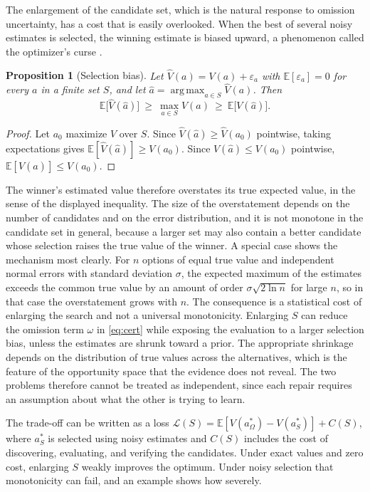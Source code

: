 \documentclass[11pt]{article}
\newtheorem{proposition}{Proposition}
\theoremstyle{definition}
\theoremstyle{remark}
\newcommand{\E}{\mathbb{E}}
\DeclareMathOperator*{\argmax}{arg\,max}
\begin{document}
The enlargement of the candidate set, which is the natural response to omission uncertainty, has a cost that is easily overlooked. When the best of several noisy estimates is selected, the winning estimate is biased upward, a phenomenon called the optimizer's curse \citep{smith2006}.

\begin{proposition}[Selection bias]
\label{prop:curse}
Let $\widehat V(a)=V(a)+\varepsilon_a$ with $\E[\varepsilon_a]=0$ for every $a$ in a finite set $S$, and let $\hat a=\argmax_{a\in S}\widehat V(a)$. Then
\begin{equation}
\E\big[\widehat V(\hat a)\big]\ \ge\ \max_{a\in S}V(a)\ \ge\ \E\big[V(\hat a)\big].
\end{equation}
\end{proposition}

\begin{proof}
Let $a_0$ maximize $V$ over $S$. Since $\widehat V(\hat a)\ge\widehat V(a_0)$ pointwise, taking expectations gives $\E[\widehat V(\hat a)]\ge V(a_0)$. Since $V(\hat a)\le V(a_0)$ pointwise, $\E[V(\hat a)]\le V(a_0)$.
\end{proof}

The winner's estimated value therefore overstates its true expected value, in the sense of the displayed inequality. The size of the overstatement depends on the number of candidates and on the error distribution, and it is not monotone in the candidate set in general, because a larger set may also contain a better candidate whose selection raises the true value of the winner. A special case shows the mechanism most clearly. For $n$ options of equal true value and independent normal errors with standard deviation $\sigma$, the expected maximum of the estimates exceeds the common true value by an amount of order $\sigma\sqrt{2\ln n}$ for large $n$, so in that case the overstatement grows with $n$. The consequence is a statistical cost of enlarging the search and not a universal monotonicity. Enlarging $S$ can reduce the omission term $\omega$ in \eqref{eq:cert} while exposing the evaluation to a larger selection bias, unless the estimates are shrunk toward a prior. The appropriate shrinkage depends on the distribution of true values across the alternatives, which is the feature of the opportunity space that the evidence does not reveal. The two problems therefore cannot be treated as independent, since each repair requires an assumption about what the other is trying to learn.

The trade-off can be written as a loss $\mathcal L(S)=\E[V(a_\Omega^{*})-V(a_S^{*})]+C(S)$, where $a_S^{*}$ is selected using noisy estimates and $C(S)$ includes the cost of discovering, evaluating, and verifying the candidates. Under exact values and zero cost, enlarging $S$ weakly improves the optimum. Under noisy selection that monotonicity can fail, and an example shows how severely.
\end{document}
